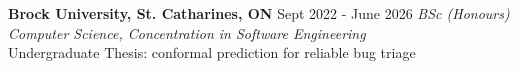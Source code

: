 



\begin{cvhonors}
  \cvhonor
    { {\bf Brock University, St. Catharines, ON} } %
    {Sept 2022 - June 2026} %
    {\large\it{BSc (Honours) Computer Science, Concentration in Software Engineering}} %
    \\
    Undergraduate Thesis: conformal prediction for reliable bug triage
\vspace{0.4em}
\end{cvhonors}
\vspace{-1em} %
